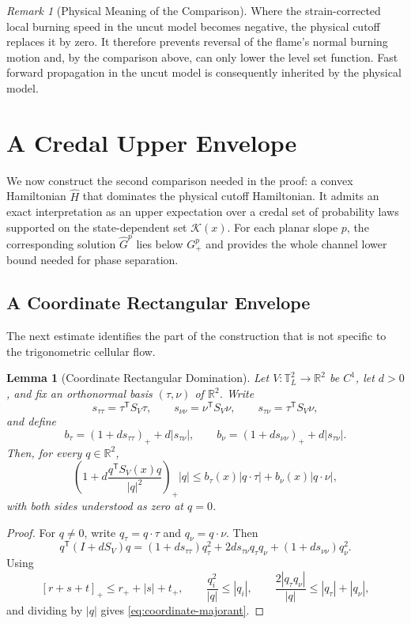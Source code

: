 \documentclass[11pt,reqno,noamsfonts]{amsart}
\newtheorem{lemma}[theorem]{Lemma}
\theoremstyle{definition}
\theoremstyle{remark}
\newtheorem{remark}[theorem]{Remark}
\newcommand{\T}{\mathbb T}
\begin{document}
\begin{remark}[Physical Meaning of the Comparison]
Where the strain-corrected local burning speed in the uncut model becomes
negative, the physical cutoff replaces it by zero. It therefore prevents
reversal of the flame's normal burning motion and, by the comparison
above, can only lower the level set function. Fast forward propagation
in the uncut model is consequently inherited by the physical model.
\end{remark}

\section{A Credal Upper Envelope}\label{sec:credal}
We now construct the second comparison needed in the proof: a convex
Hamiltonian $\widehat H$ that dominates the physical cutoff Hamiltonian.
It admits an exact interpretation as an upper expectation over a credal
set of probability laws supported on the state-dependent set
$\mathcal K(x)$.  For each planar slope $p$, the corresponding solution
$\widehat G^p$ lies below $G_+^p$ and provides the whole channel lower
bound needed for phase separation.
\subsection{A Coordinate Rectangular Envelope}
The next estimate identifies the part of the construction that is not
specific to the trigonometric cellular flow.

\begin{lemma}[Coordinate Rectangular Domination]
\label{lem:rectangular-domination}
Let $V:\T_L^2\to\mathbb R^2$ be $C^1$, let $d>0$, and fix an
orthonormal basis $(\tau,\nu)$ of $\mathbb R^2$.  Write
\[
  s_{\tau\tau}=\tau^{\mathsf T}S_V\tau,
  \qquad
  s_{\nu\nu}=\nu^{\mathsf T}S_V\nu,
  \qquad
  s_{\tau\nu}=\tau^{\mathsf T}S_V\nu,
\]
and define
\[
  b_\tau=(1+ds_{\tau\tau})_+ +d|s_{\tau\nu}|,
  \qquad
  b_\nu=(1+ds_{\nu\nu})_+ +d|s_{\tau\nu}|.
\]
Then, for every $q\in\mathbb R^2$,
\begin{equation}\label{eq:coordinate-majorant}
  \left(
    1+d\frac{q^{\mathsf T}S_V(x)q}{|q|^2}
  \right)_+|q|
  \le
  b_\tau(x)|q\cdot\tau|+b_\nu(x)|q\cdot\nu|,
\end{equation}
with both sides understood as zero at $q=0$.
\end{lemma}

\begin{proof}
For $q\ne0$, write
$q_\tau=q\cdot\tau$ and $q_\nu=q\cdot\nu$.  Then
\[
  q^{\mathsf T}(I+dS_V)q
  =(1+ds_{\tau\tau})q_\tau^2
   +2ds_{\tau\nu}q_\tau q_\nu
   +(1+ds_{\nu\nu})q_\nu^2.
\]
Using
\[
  [r+s+t]_+\le r_++|s|+t_+,
  \qquad
  \frac{q_i^2}{|q|}\le|q_i|,
  \qquad
  \frac{2|q_\tau q_\nu|}{|q|}
  \le|q_\tau|+|q_\nu|,
\]
and dividing by $|q|$ gives \eqref{eq:coordinate-majorant}.
\end{proof}
\end{document}
